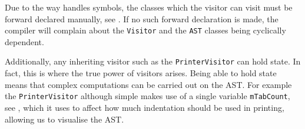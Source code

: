 Due to the way \CC{} handles symbols, the classes which the
visitor can visit must be forward declared manually, see
. If no such forward declaration is
made, the compiler will complain about the \texttt{Visitor} and
the \texttt{AST} classes being cyclically dependent.

Additionally, any inheriting visitor such as the
\texttt{PrinterVisitor} can hold state. In fact, this is where
the true power of visitors arises. Being able to hold state
means that complex computations can be carried out on the AST.
For example the \texttt{PrinterVisitor} although simple makes
use of a single variable \texttt{mTabCount}, see
, which it uses to affect how much
indentation should be used in printing, allowing us to visualise
the AST.


